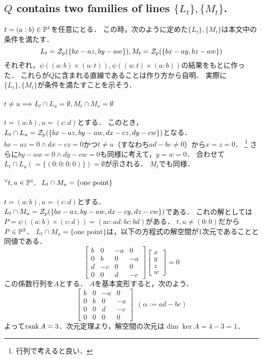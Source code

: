 \documentclass[a4paper]{jsarticle}
\begin{document}
    \subsection{$Q$ contains two families of lines $\{L_t\}, \{M_t\}$.}
    $t=(a:b) \in \mathbb{P}^1$を任意にとる．
    この時，次のように定めた$\{L_t\}, \{M_t\}$は本文中の条件を満たす．
    \[ L_t=\mathcal{Z}_p(\{bx-az, by-aw\}), M_t=\mathcal{Z}_p(\{bx-ay, bz-aw\})  \]
    それぞれ，$\psi((a:b) \times (u:t)), \psi((u:t) \times (a:b))$の結果をもとに作った．
    これらが$Q$に含まれる直線であることは作り方から自明．
    実際に$\{L_t\}, \{M_t\}$が条件を満たすことを示そう．

    \paragraph{$t \neq u \implies L_t \cap L_u=\emptyset, M_t \cap M_u=\emptyset$}
    $t=(a:b), u=(c:d)$とする．
    このとき，$L_t \cap L_u=\mathcal{Z}_p(\{bx-az, by-aw, dx-cz, dy-cw\})$となる．
    $bx-az=0 \land dx-cz=0$かつ$t \neq u$（すなわち$ad-bc \neq 0$）から$x=z=0$．
    \footnote{行列で考えると良い．}
    さらに$by-aw=0 \land dy-cw=0$も同様に考えて，$y=w=0$．
    合わせて$L_t \cap L_u(=\{(0:0:0:0)\})=\emptyset$が示される．
    $M_t$でも同様．

    \paragraph{${}^{\forall} t,u \in \mathbb{P}^1,~~ L_t \cap M_u = \{\mbox{one point}\}$}
    $t=(a:b), u=(c:d)$とする．
    $L_t \cap M_u=\mathcal{Z}_p(\{bx-az, by-aw, dx-cy, dz-cw\})$である．
    これの解としては$P=\psi((a:b) \times (c:d))=(ac:ad:bc:bd)$がある．
    $t,u \neq (0:0)$だから$P \in \mathbb{P}^3$．
    $L_t \cap M_u = \{\mbox{one point}\}$は，以下の方程式の解空間が1次元であることと同値である．
    \[
        \begin{bmatrix}
            b & 0 & -a & 0 \\
            0 & b & 0 & -a \\
            d & -c & 0 & 0 \\
            0 & 0 & d & -c
        \end{bmatrix}
        \begin{bmatrix}
            x \\ y \\ z \\ w
        \end{bmatrix}
        =0
    \]
    この係数行列を$A$とする．
    $A$を基本変形すると，次のよう．
    \[
        \begin{bmatrix}
            b & 0 & -a & 0 \\
            0 & b & 0 & -a \\
            0 & 0 & d & -c \\
            0 & 0 & 0 & 0
        \end{bmatrix}
        ~~(\alpha:=ad-bc)
    \]
    よって$\operatorname{rank} A=3$．次元定理より，解空間の次元は$\dim \ker A=4-3=1$．
\end{document}

